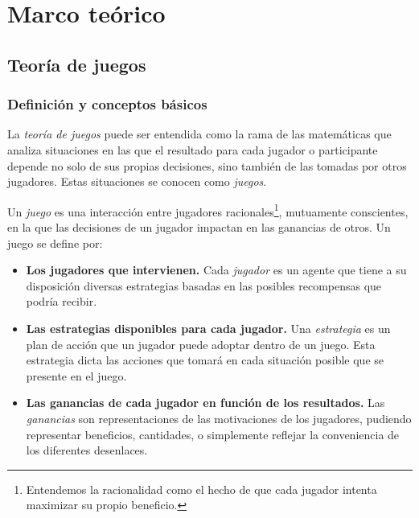 \chapter{Marco teórico}
\justifying



\section{Teoría de juegos}
\subsection*{Definición y conceptos básicos}

La \emph{teoría de juegos} puede ser entendida como la rama de las
matemáticas que analiza situaciones en las que el resultado para
cada jugador o participante depende no solo de sus propias
decisiones, sino también de las tomadas por otros
jugadores. Estas situaciones se conocen como \emph{juegos}.

\begin{definition}
  Un \emph{juego} es una interacción entre jugadores
  racionales\footnote{Entendemos la racionalidad como el
  hecho de que cada jugador intenta maximizar su propio
  beneficio.}, mutuamente conscientes, en la que las
  decisiones de un jugador impactan en las ganancias de
  otros. Un juego se define por:
  \begin{itemize}
    \item \textbf{Los jugadores que intervienen.} Cada \emph{jugador}
      es un agente que tiene a su disposición diversas
      estrategias basadas en las posibles recompensas que
      podría recibir.

    \item \textbf{Las estrategias disponibles para cada jugador.}
      Una \emph{estrategia} es un plan de acción que un jugador
      puede adoptar dentro de un juego. Esta estrategia dicta las
      acciones que tomará en cada situación posible que se presente
      en el juego.

    \item \textbf{Las ganancias de cada jugador en función de los
      resultados.} Las \emph{ganancias} son representaciones de
      las motivaciones de los jugadores, pudiendo representar
      beneficios, cantidades, o simplemente reflejar la conveniencia
      de los diferentes desenlaces.
  \end{itemize}
\end{definition}

